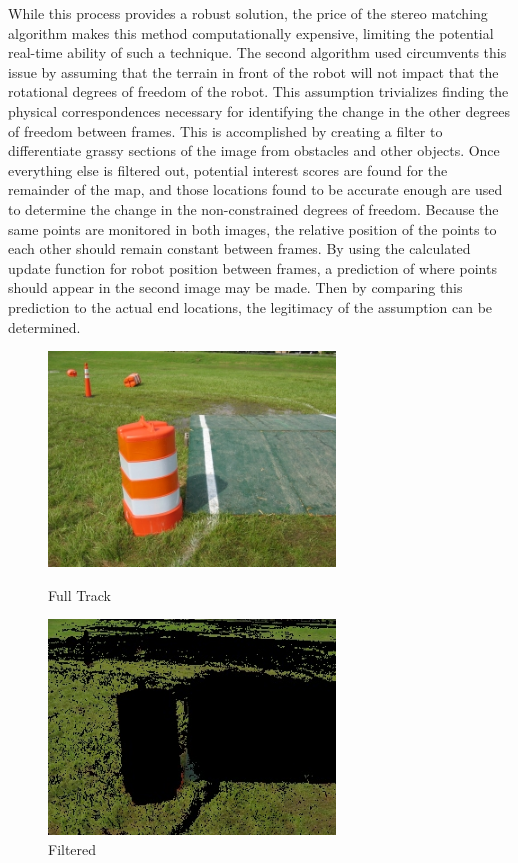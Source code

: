 While this process provides a robust solution, the price of the stereo matching algorithm makes this method computationally expensive, limiting the potential real-time ability of such a technique. The second algorithm used circumvents this issue by assuming that the terrain in front of the robot will not impact that the rotational degrees of freedom of the robot. This assumption trivializes finding the physical correspondences necessary for identifying the change in the other degrees of freedom between frames. This is accomplished by creating a filter to differentiate grassy sections of the image from obstacles and other objects. Once everything else is filtered out, potential interest scores are found for the remainder of the map, and those locations found to be accurate enough are used to determine the change in the non-constrained degrees of freedom. Because the same points are monitored in both images, the relative position of the points to each other should remain constant between frames. By using the calculated update function for robot position between frames, a prediction of where points should appear in the second image may be made. Then by comparing this prediction to the actual end locations, the legitimacy of the assumption can be determined.

\begin{figure}[H]
\begin{minipage}[b]{0.5\linewidth}
\centering
\includegraphics[width=3in]{./Pics/BenCode_534_small.jpg}
\caption{Full Track}
\label{FIG:Track}
\end{minipage}
\hspace{0.1in}
\begin{minipage}[b]{0.5\linewidth}
\centering
\includegraphics[width=3in]{./Pics/BenCode_534_small_green.jpg}
\caption{Filtered}
\label{FIG:Filtered}
\end{minipage}
\end{figure}

